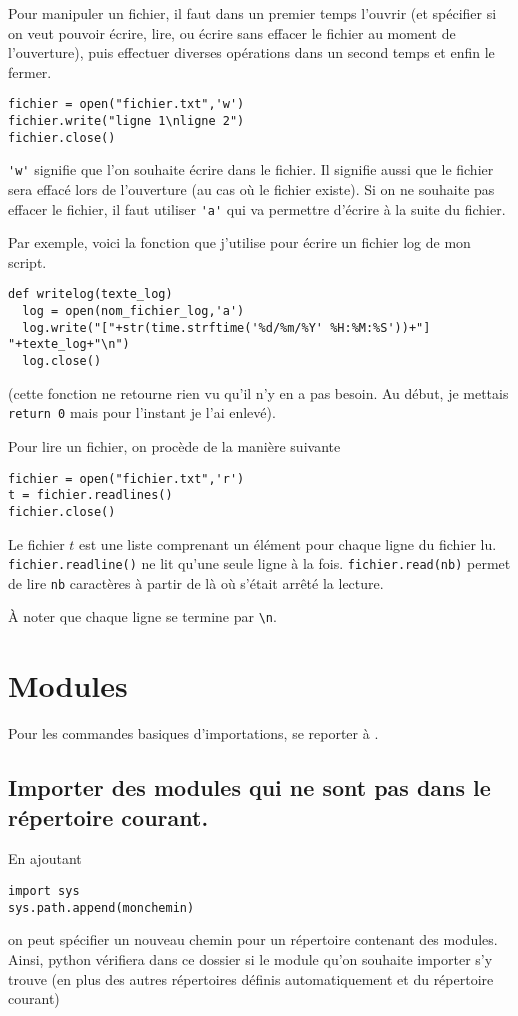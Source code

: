 \documentclass[a4paper,twoside]{article}
\begin{document}
Pour manipuler un fichier, il faut dans un premier temps l'ouvrir (et spécifier si on veut pouvoir écrire, lire, ou écrire sans effacer le fichier au moment de l'ouverture), puis effectuer diverses opérations dans un second temps et enfin le fermer.

\begin{verbatim}
fichier = open("fichier.txt",'w')
fichier.write("ligne 1\nligne 2")
fichier.close()
\end{verbatim}
\verb|'w'| signifie que l'on souhaite écrire dans le fichier. Il signifie aussi que le fichier sera effacé lors de l'ouverture (au cas où le fichier existe). Si on ne souhaite pas effacer le fichier, il faut utiliser \verb|'a'| qui va permettre d'écrire à la suite du fichier.

Par exemple, voici la fonction que j'utilise pour écrire un fichier log de mon script.

\begin{verbatim}
def writelog(texte_log)
  log = open(nom_fichier_log,'a')
  log.write("["+str(time.strftime('%d/%m/%Y' %H:%M:%S'))+"] "+texte_log+"\n")
  log.close()
\end{verbatim}
(cette fonction ne retourne rien vu qu'il n'y en a pas besoin. Au début, je mettais \verb|return 0| mais pour l'instant je l'ai enlevé).

\bigskip

Pour lire un fichier, on procède de la manière suivante
\begin{verbatim}
fichier = open("fichier.txt",'r')
t = fichier.readlines()
fichier.close()
\end{verbatim}

Le fichier $t$ est une liste comprenant un élément pour chaque ligne du fichier lu. \texttt{fichier.readline()} ne lit qu'une seule ligne à la fois. \texttt{fichier.read(nb)} permet de lire \texttt{nb} caractères à partir de là où s'était arrêté la lecture.

\begin{remarque}
À noter que chaque ligne se termine par \verb|\n|.
\end{remarque}

\section{Modules}
Pour les commandes basiques d'importations, se reporter à .

\subsection{Importer des modules qui ne sont pas dans le répertoire courant.}
En ajoutant
\begin{verbatim}
import sys
sys.path.append(monchemin)
\end{verbatim}
on peut spécifier un nouveau chemin pour un répertoire contenant des modules. Ainsi, python vérifiera dans ce dossier si le module qu'on souhaite importer s'y trouve (en plus des autres répertoires définis automatiquement et du répertoire courant)
\end{document}
